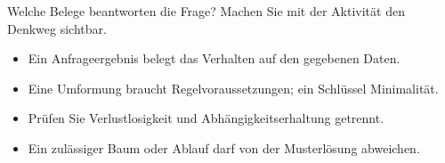 \begin{frame}[t]{Welche Belege beantworten die Frage?}
Machen Sie mit der Aktivität den Denkweg sichtbar.
\medskip
\begin{itemize}
\item Ein Anfrageergebnis belegt das Verhalten auf den gegebenen Daten.
\item Eine Umformung braucht Regelvoraussetzungen; ein Schlüssel Minimalität.
\item Prüfen Sie Verlustlosigkeit und Abhängigkeitserhaltung getrennt.
\item Ein zulässiger Baum oder Ablauf darf von der Musterlösung abweichen.
\end{itemize}
\end{frame}
